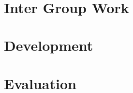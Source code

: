 



%

	\begin{titlepage}
	
	\thispagestyle{empty}

\ \pagebreak{} 
	\thispagestyle{empty}
	\end{titlepage}



\cleardoublepage
	
\newpage
\tableofcontents

\thispagestyle{empty}
\begin{titlepage}
\end{titlepage}
	
	
	\part{Inter Group Work}
	
	
 
\part{Development}
\label{part:development}

	
	
	
	
	
	
	
	
	
	
	
	
	
	
\part{Evaluation}
\label{part:evaluation}
	

	
  
	
	
	
		
		
		

	\cleardoublepage
{}
\label{chap:bib}


\cleardoublepage{}
\listoffigures

\cleardoublepage{}
\lstlistoflistings

\appendix	
	

